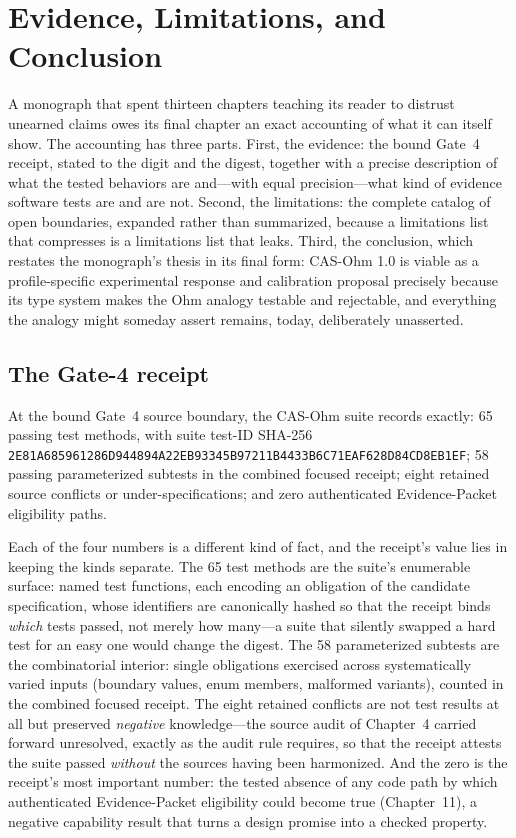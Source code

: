 \chapter{Evidence, Limitations, and Conclusion}\label{evid:chapter}

A monograph that spent thirteen chapters teaching its reader to distrust unearned claims owes its final chapter an exact accounting of what it can itself show. The accounting has three parts. First, the evidence: the bound Gate~4 receipt, stated to the digit and the digest, together with a precise description of what the tested behaviors are and---with equal precision---what kind of evidence software tests are and are not. Second, the limitations: the complete catalog of open boundaries, expanded rather than summarized, because a limitations list that compresses is a limitations list that leaks. Third, the conclusion, which restates the monograph's thesis in its final form: CAS-Ohm 1.0 is viable as a profile-specific experimental response and calibration proposal precisely because its type system makes the Ohm analogy testable and rejectable, and everything the analogy might someday assert remains, today, deliberately unasserted.

\section{The Gate-4 receipt}\label{evid:sec:receipt}

\begin{finding}\label{evid:find:receipt}
At the bound Gate~4 source boundary, the CAS-Ohm suite records exactly: 65 passing test methods, with suite test-ID SHA-256
\texttt{2E81A685961286D944894A22EB93345B97211B4433B6C71EAF628D84CD8EB1EF};
58 passing parameterized subtests in the combined focused receipt; eight retained source conflicts or under-specifications; and zero authenticated Evidence-Packet eligibility paths.
\end{finding}

Each of the four numbers is a different kind of fact, and the receipt's value lies in keeping the kinds separate. The 65 test methods are the suite's enumerable surface: named test functions, each encoding an obligation of the candidate specification, whose identifiers are canonically hashed so that the receipt binds \emph{which} tests passed, not merely how many---a suite that silently swapped a hard test for an easy one would change the digest. The 58 parameterized subtests are the combinatorial interior: single obligations exercised across systematically varied inputs (boundary values, enum members, malformed variants), counted in the combined focused receipt. The eight retained conflicts are not test results at all but preserved \emph{negative} knowledge---the source audit of Chapter~4 carried forward unresolved, exactly as the audit rule requires, so that the receipt attests the suite passed \emph{without} the sources having been harmonized. And the zero is the receipt's most important number: the tested absence of any code path by which authenticated Evidence-Packet eligibility could become true (Chapter~11), a negative capability result that turns a design promise into a checked property.

